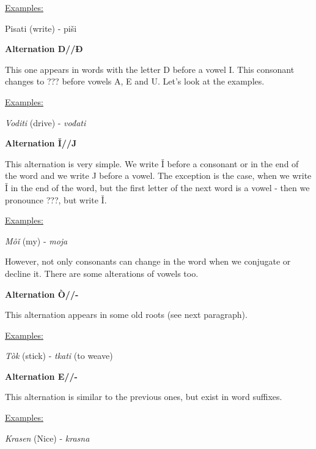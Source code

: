 \underline{Examples:}

Pisati (write) \textipa{[’pisat1]} - piši \textipa{[pi’\:s1]}


\textbf{Alternation D//Đ}

This one appears in words with the letter D before a vowel I. This consonant changes to ??? before vowels A, E and U. Let’s look at the examples.

\underline{Examples:}

\textit{Voditi} (drive) \textipa{[‘vodit1]} - \textit{vođati} 

\textbf{Alternation Ǐ//J}

This alternation is very simple. We write Ǐ before a consonant or in the end of the word and we write J before a vowel. The exception is the case, when we write Ǐ in the end of the word, but the first letter of the next word is a vowel - then we pronounce ???, but write Ǐ.

\underline{Examples:}

\textit{Môǐ} (my) \textipa{[mUj]} - \textit{moja} \textipa{[m2'Ja]}

However, not only consonants can change in the word when we conjugate or decline it. There are some alterations of vowels too.

\textbf{Alternation Ò//-}

This alternation appears in some old roots (see next paragraph).

\underline{Examples:}

\textit{Tòk} (stick) \textipa{[t@k]} - \textit{tkati} \textipa{['tkatI]} (to weave)


\textbf{Alternation E//-}

This alternation is similar to the previous ones, but exist in word suffixes.

\underline{Examples:}

\textit{Krasen} (Nice) \textipa{['kras@n]} - \textit{krasna} \textipa{['krasna]}






